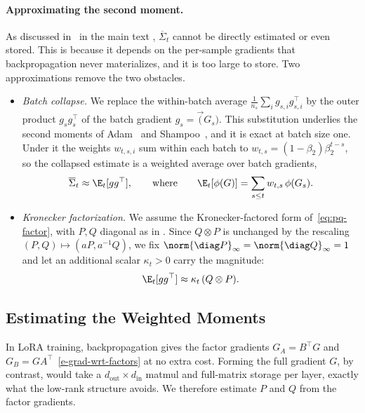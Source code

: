 
\paragraph{Approximating the second moment.} As discussed in~ in the main text ,
$\overline\Sigma_t$ cannot be directly estimated or even stored. 
This is because it depends on the  per-sample
gradients that backpropagation never materializes, and it is too large
to store. Two approximations remove the two obstacles.
\begin{itemize}[leftmargin=1.5em,itemsep=2pt,topsep=2pt]
  \item \emph{Batch collapse.} We replace the within-batch average
  $\frac1{n_s}\sum_ig_{s,i}g_{s,i}^\top$ by the outer product
  $g_sg_s^\top$ of the batch gradient $g_s=\vec(G_s)$. This substitution
  underlies the second moments of Adam~\cite{adam} and
  Shampoo~\cite{shampoo}, and it is exact at batch size one. Under it
  the weights $w_{t,s,i}$ sum within each batch to
  $w_{t,s}=(1-\beta_2)\beta_2^{t-s}$, so the collapsed estimate is a
  weighted average over batch gradients,
  \[
    \overline\Sigma_t\approx\E_t[gg^\top],
    \qquad\text{where}\qquad
    \E_t[\phi(G)]=\sum_{s\le t}w_{t,s}\,\phi(G_s).
  \]
  \item \emph{Kronecker factorization.} We assume the
  Kronecker-factored form of~\eqref{eq:pq-factor}, with
  $P,Q$ diagonal as in . Since $Q\otimes P$ is unchanged
  by the rescaling $(P,Q)\mapsto(aP,a^{-1}Q)$, we fix
  $\norm{\diag P}_\infty=\norm{\diag Q}_\infty=1$ and let an additional scalar
  $\kappa_t>0$ carry the magnitude:
  \begin{equation}\label{e-diag-kron-second-mom-model}
    \E_t[gg^\top]\approx\kappa_t\,(Q\otimes P).
  \end{equation}
\end{itemize}

\subsection{Estimating the Weighted Moments}
\label{sec:weighted-estimation}
In LoRA training, backpropagation gives the factor gradients $G_A=B^\top G$
and $G_B=GA^\top$~\eqref{e-grad-wrt-factors} at no extra cost. Forming
the full gradient $G$, by contrast, would take a $d_{\mathrm{out}}\times
d_{\mathrm{in}}$ matmul and full-matrix storage per layer, exactly what
the low-rank structure avoids. We therefore estimate $P$ and $Q$ from the
factor gradients. 

